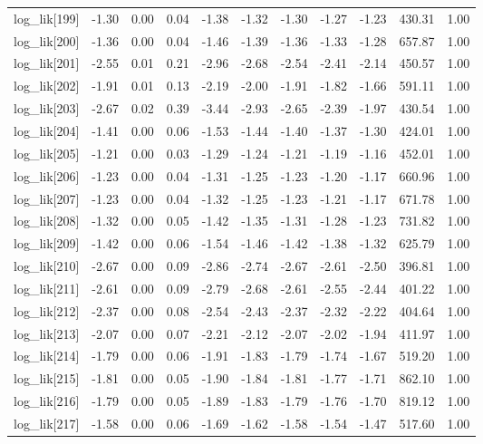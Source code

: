 \begin{table}[ht]
\begin{tabular}{rrrrrrrrrrr}
  log\_lik[199] & -1.30 & 0.00 & 0.04 & -1.38 & -1.32 & -1.30 & -1.27 & -1.23 & 430.31 & 1.00 \\ 
  log\_lik[200] & -1.36 & 0.00 & 0.04 & -1.46 & -1.39 & -1.36 & -1.33 & -1.28 & 657.87 & 1.00 \\ 
  log\_lik[201] & -2.55 & 0.01 & 0.21 & -2.96 & -2.68 & -2.54 & -2.41 & -2.14 & 450.57 & 1.00 \\ 
  log\_lik[202] & -1.91 & 0.01 & 0.13 & -2.19 & -2.00 & -1.91 & -1.82 & -1.66 & 591.11 & 1.00 \\ 
  log\_lik[203] & -2.67 & 0.02 & 0.39 & -3.44 & -2.93 & -2.65 & -2.39 & -1.97 & 430.54 & 1.00 \\ 
  log\_lik[204] & -1.41 & 0.00 & 0.06 & -1.53 & -1.44 & -1.40 & -1.37 & -1.30 & 424.01 & 1.00 \\ 
  log\_lik[205] & -1.21 & 0.00 & 0.03 & -1.29 & -1.24 & -1.21 & -1.19 & -1.16 & 452.01 & 1.00 \\ 
  log\_lik[206] & -1.23 & 0.00 & 0.04 & -1.31 & -1.25 & -1.23 & -1.20 & -1.17 & 660.96 & 1.00 \\ 
  log\_lik[207] & -1.23 & 0.00 & 0.04 & -1.32 & -1.25 & -1.23 & -1.21 & -1.17 & 671.78 & 1.00 \\ 
  log\_lik[208] & -1.32 & 0.00 & 0.05 & -1.42 & -1.35 & -1.31 & -1.28 & -1.23 & 731.82 & 1.00 \\ 
  log\_lik[209] & -1.42 & 0.00 & 0.06 & -1.54 & -1.46 & -1.42 & -1.38 & -1.32 & 625.79 & 1.00 \\ 
  log\_lik[210] & -2.67 & 0.00 & 0.09 & -2.86 & -2.74 & -2.67 & -2.61 & -2.50 & 396.81 & 1.00 \\ 
  log\_lik[211] & -2.61 & 0.00 & 0.09 & -2.79 & -2.68 & -2.61 & -2.55 & -2.44 & 401.22 & 1.00 \\ 
  log\_lik[212] & -2.37 & 0.00 & 0.08 & -2.54 & -2.43 & -2.37 & -2.32 & -2.22 & 404.64 & 1.00 \\ 
  log\_lik[213] & -2.07 & 0.00 & 0.07 & -2.21 & -2.12 & -2.07 & -2.02 & -1.94 & 411.97 & 1.00 \\ 
  log\_lik[214] & -1.79 & 0.00 & 0.06 & -1.91 & -1.83 & -1.79 & -1.74 & -1.67 & 519.20 & 1.00 \\ 
  log\_lik[215] & -1.81 & 0.00 & 0.05 & -1.90 & -1.84 & -1.81 & -1.77 & -1.71 & 862.10 & 1.00 \\ 
  log\_lik[216] & -1.79 & 0.00 & 0.05 & -1.89 & -1.83 & -1.79 & -1.76 & -1.70 & 819.12 & 1.00 \\ 
  log\_lik[217] & -1.58 & 0.00 & 0.06 & -1.69 & -1.62 & -1.58 & -1.54 & -1.47 & 517.60 & 1.00 \\ 

\end{tabular}
\end{table}
